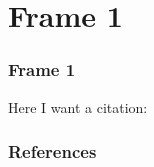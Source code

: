 \documentclass{beamer}
\let\oldcite=\cite
\renewcommand\cite[1]{\hyperlink{#1}{\textcolor{green}{\oldcite{#1}}}}
\begin{document}
\section{Frame 1}
\begin{frame}
\frametitle{Frame 1}
    Here I want a citation:

    \cite{Forrest2014}
\end{frame}


\begin{frame}[allowframebreaks]
\frametitle{References}
    \printbibliography
\end{frame}
\end{document}
